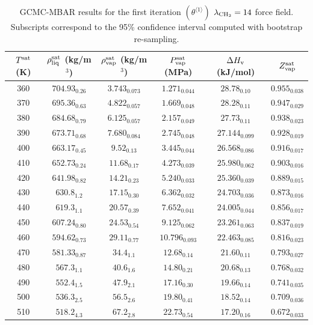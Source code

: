\documentclass[journal=jctc,manuscript=article]{achemso}
\begin{document}
	\begin{table}[htb!]
		\caption{GCMC-MBAR results for the first iteration $(\theta^{\langle1\rangle})$ $\lambda_{\rm CH_2} = 14$ force field. Subscripts correspond to the 95\% confidence interval computed with bootstrap re-sampling.}
		\begin{center}
			\begin{tabular}{|c|c|c|c|c|c|}
				\hline
				$T^{\rm sat}$ (K) & $\rho_{\rm liq}^{\rm sat}$ (kg/m$^3$) & $\rho_{\rm vap}^{\rm sat}$ (kg/m$^3$) & $P_{\rm vap}^{\rm sat}$ (MPa) & $\Delta H_{\rm v}$ (kJ/mol) & $Z_{\rm vap}^{\rm sat}$ \\ \hline
				360 & $704.93_{0.26}$ & $3.743_{0.073}$ & $1.271_{0.044}$ & $28.78_{0.10}$ & $0.955_{0.038}$ \\
				370 & $695.36_{0.63}$ & $4.822_{0.057}$ & $1.669_{0.048}$ & $28.28_{0.11}$ & $0.947_{0.029}$ \\
				380 & $684.68_{0.79}$ & $6.125_{0.057}$ & $2.157_{0.049}$ & $27.73_{0.11}$ & $0.938_{0.023}$ \\
				390 & $673.71_{0.68}$ & $7.680_{0.084}$ & $2.745_{0.048}$ & $27.144_{0.099}$ & $0.928_{0.019}$ \\
				400 & $663.17_{0.45}$ & $9.52_{0.13}$ & $3.445_{0.044}$ & $26.568_{0.086}$ & $0.916_{0.017}$ \\
				410 & $652.73_{0.24}$ & $11.68_{0.17}$ & $4.273_{0.039}$ & $25.980_{0.062}$ & $0.903_{0.016}$ \\
				420 & $641.98_{0.82}$ & $14.21_{0.23}$ & $5.240_{0.033}$ & $25.360_{0.039}$ & $0.889_{0.015}$ \\
				430 & $630.8_{1.2}$ & $17.15_{0.30}$ & $6.362_{0.032}$ & $24.703_{0.036}$ & $0.873_{0.016}$ \\
				440 & $619.3_{1.1}$ & $20.57_{0.39}$ & $7.652_{0.041}$ & $24.005_{0.044}$ & $0.856_{0.017}$ \\
				450 & $607.24_{0.80}$ & $24.53_{0.54}$ & $9.125_{0.062}$ & $23.261_{0.063}$ & $0.837_{0.019}$ \\
				460 & $594.62_{0.73}$ & $29.11_{0.77}$ & $10.796_{0.093}$ & $22.463_{0.085}$ & $0.816_{0.023}$ \\
				470 & $581.33_{0.87}$ & $34.4_{1.1}$ & $12.68_{0.14}$ & $21.60_{0.11}$ & $0.793_{0.027}$ \\
				480 & $567.3_{1.1}$ & $40.6_{1.6}$ & $14.80_{0.21}$ & $20.68_{0.13}$ & $0.768_{0.032}$ \\
				490 & $552.4_{1.5}$ & $47.9_{2.1}$ & $17.16_{0.30}$ & $19.66_{0.14}$ & $0.741_{0.035}$ \\
				500 & $536.3_{2.5}$ & $56.5_{2.6}$ & $19.80_{0.41}$ & $18.52_{0.14}$ & $0.709_{0.036}$ \\
				510 & $518.2_{4.3}$ & $67.2_{2.8}$ & $22.73_{0.54}$ & $17.20_{0.16}$ & $0.672_{0.033}$ \\
				\hline
			\end{tabular}
		\end{center}
	\end{table}
\end{document}
